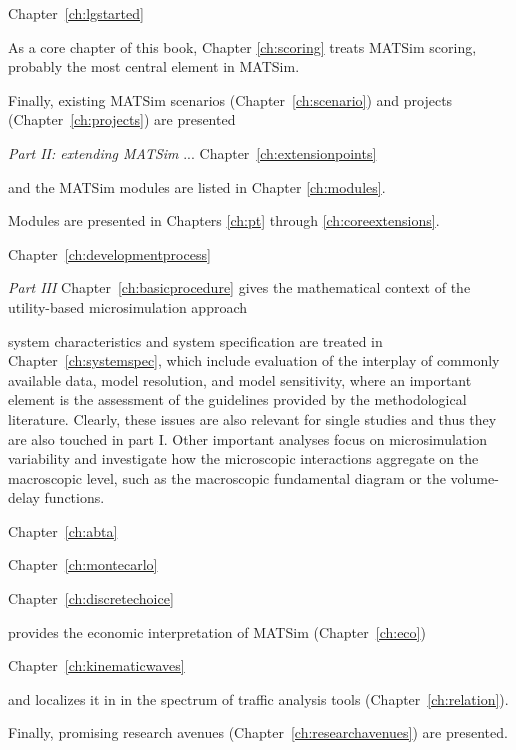 Chapter~\ref{ch:lgstarted}

As a core chapter of this book, Chapter \ref{ch:scoring} treats MATSim scoring, probably the most central element in MATSim. 

Finally, existing MATSim scenarios (Chapter~\ref{ch:scenario}) and projects (Chapter~\ref{ch:projects}) are presented 

\emph{Part II: extending MATSim} ...
Chapter~\ref{ch:extensionpoints}

and the MATSim modules are listed in Chapter \ref{ch:modules}.

Modules are presented in Chapters \ref{ch:pt} through \ref{ch:coreextensions}.

Chapter~\ref{ch:developmentprocess} 

\emph{Part III}
Chapter~\ref{ch:basicprocedure} gives the mathematical context of the utility-based microsimulation approach

system characteristics and system specification are treated in Chapter~\ref{ch:systemspec}, which include evaluation of the interplay of commonly available data, model resolution, and model sensitivity, where an important element is the assessment of the guidelines provided by the methodological literature. Clearly, these issues are also relevant for single studies and thus they are also touched in part I. Other important analyses focus on microsimulation variability and investigate how the microscopic interactions aggregate on the macroscopic level, such as the macroscopic fundamental diagram or the volume-delay functions.

Chapter~\ref{ch:abta}

Chapter~\ref{ch:montecarlo}

Chapter~\ref{ch:discretechoice}


provides the economic interpretation of MATSim (Chapter~\ref{ch:eco}) 

Chapter~\ref{ch:kinematicwaves}

and localizes it in in the spectrum of traffic analysis tools (Chapter~\ref{ch:relation}). 



Finally, promising research avenues (Chapter~\ref{ch:researchavenues}) are presented.


